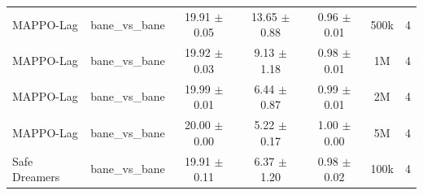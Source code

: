 \documentclass{article}
\begin{document}
\begin{longtable}{lcccccc}
MAPPO-Lag & bane\_vs\_bane & \textcolor{red!70!black}{19.91 $\pm$ 0.05} & \textcolor{green!60!black}{13.65 $\pm$ 0.88} & \textcolor{green!60!black}{0.96 $\pm$ 0.01} & 500k & 4 \\
MAPPO-Lag & bane\_vs\_bane & \textcolor{red!70!black}{19.92 $\pm$ 0.03} & \textcolor{green!60!black}{9.13 $\pm$ 1.18} & \textcolor{green!60!black}{0.98 $\pm$ 0.01} & 1M & 4 \\
MAPPO-Lag & bane\_vs\_bane & \textcolor{red!70!black}{19.99 $\pm$ 0.01} & \textcolor{green!60!black}{6.44 $\pm$ 0.87} & \textcolor{red!70!black}{0.99 $\pm$ 0.01} & 2M & 4 \\
MAPPO-Lag & bane\_vs\_bane & \textcolor{red!70!black}{20.00 $\pm$ 0.00} & \textcolor{red!70!black}{5.22 $\pm$ 0.17} & \textcolor{red!70!black}{1.00 $\pm$ 0.00} & 5M & 4 \\
Safe Dreamers & bane\_vs\_bane & 19.91 $\pm$ 0.11 & 6.37 $\pm$ 1.20 & 0.98 $\pm$ 0.02 & 100k & 4 \\
\end{longtable}
\end{document}
